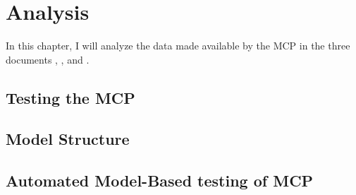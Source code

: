 \chapter{Analysis}

In this chapter, I will analyze the data made available by the MCP in the three documents , , and . 

\section{Testing the MCP} %


\section{Model Structure}

\section{Automated Model-Based testing of MCP}
